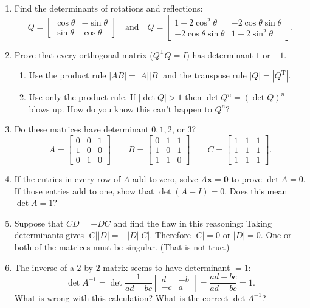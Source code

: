 \documentclass[14pt, a4paper]{article}
\begin{document}
\begin{enumerate}
    \item Find the determinants of rotations and reflections:
          \[
              Q = \begin{bmatrix} \cos\theta & -\sin\theta \\ \sin\theta & \cos\theta \end{bmatrix} \quad \text{and} \quad Q = \begin{bmatrix} 1 - 2\cos^2\theta & -2\cos\theta\sin\theta \\ -2\cos\theta\sin\theta & 1 - 2\sin^2\theta \end{bmatrix}.
          \]

    \item Prove that every orthogonal matrix ($Q^{\mathrm{T}}Q = I$) has determinant $1$ or $-1$.
          \begin{enumerate}
              \item Use the product rule $|AB| = |A||B|$ and the transpose rule $|Q| = |Q^{\mathrm{T}}|$.
              \item Use only the product rule. If $|\det Q| > 1$ then $\det Q^n = (\det Q)^n$ blows up. How do you know this can't happen to $Q^n$?
          \end{enumerate}

    \item Do these matrices have determinant $0, 1, 2$, or $3$?
          \[
              A = \begin{bmatrix} 0 & 0 & 1 \\ 1 & 0 & 0 \\ 0 & 1 & 0 \end{bmatrix} \qquad
              B = \begin{bmatrix} 0 & 1 & 1 \\ 1 & 0 & 1 \\ 1 & 1 & 0 \end{bmatrix} \qquad
              C = \begin{bmatrix} 1 & 1 & 1 \\ 1 & 1 & 1 \\ 1 & 1 & 1 \end{bmatrix}.
          \]

    \item If the entries in every row of $A$ add to zero, solve $A\boldsymbol{x} = \mathbf{0}$ to prove $\det A = 0$. If those entries add to one, show that $\det(A - I) = 0$. Does this mean $\det A = 1$?

    \item Suppose that $CD = -DC$ and find the flaw in this reasoning: Taking determinants gives $|C||D| = -|D||C|$. Therefore $|C| = 0$ or $|D| = 0$. One or both of the matrices must be singular. (That is not true.)

    \item The inverse of a $2$ by $2$ matrix seems to have determinant $= 1$:
          \[
              \det A^{-1} = \det \frac{1}{ad - bc} \begin{bmatrix} d & -b \\ -c & a \end{bmatrix} = \frac{ad - bc}{ad - bc} = 1.
          \]
          What is wrong with this calculation? What is the correct $\det A^{-1}$?
\end{enumerate}
\end{document}
